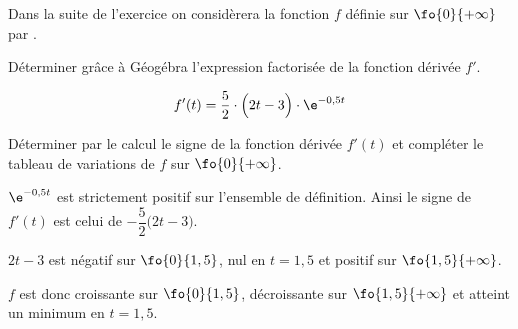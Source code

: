 \bigskip

Dans la suite de l'exercice on considèrera la fonction $f$ définie sur $\fo{0}{+\infty}$ par .

\begin{enumerate}[series=monDS, resume]
    \begin{minipage}{0.46\textwidth}
            \item Déterminer grâce à Géogébra l'expression factorisée de la fonction dérivée $f'$.

    \end{minipage}\hfill{}
    \begin{minipage}{0.48\textwidth}
\begin{blocvisiblex}[height=1.5]
    {\quad}

    \[f'(t)= \dfrac{5}{2}\cdot \Big(2t-3\Big)\cdot \e^{-0,5t}\]


    \end{blocvisiblex}
    \end{minipage}
    
    \medskip
    
    \item Déterminer par le calcul le signe de la fonction dérivée $f'(t)$ et compléter le tableau de variations de $f$ sur $\fo{0}{+\infty}$.
    \begin{blocvisiblex}[height=5.5]
    {
    \begin{minipage}{0.48\linewidth}
        \quad
    \end{minipage}\hfill{}
    \begin{minipage}{0.46\linewidth}
    \end{minipage}
    }
        \begin{minipage}{0.48\linewidth}
        $\e^{-0,5t}$ est strictement positif sur l'ensemble de définition. Ainsi le signe de $f'(t)$ est celui de $-\dfrac{5}{2}\big(2t-3\big)$.

        $2t-3$ est négatif sur $\fo{0}{1,5}$, nul en $t=1,5$ et positif sur $\fo{1,5}{+\infty}$.
    
        $f$ est donc croissante sur $\fo{0}{1,5}$, décroissante sur $\fo{1,5}{+\infty}$ et atteint un minimum en $t=1,5$.
    \end{minipage}\hfill{}
    \begin{minipage}{0.46\linewidth}
        \end{minipage}
\end{blocvisiblex}
\end{enumerate}

